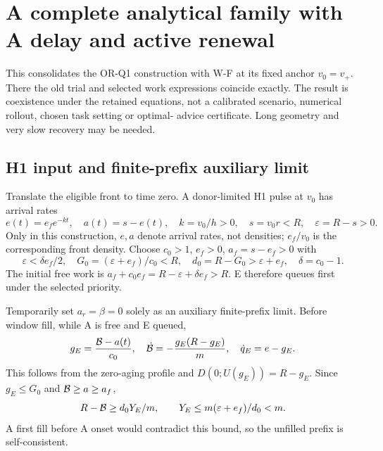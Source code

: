 \section{A complete analytical family with A delay and active renewal}
\label{sec:witness}
This consolidates the OR-Q1 construction with W-F at its fixed anchor
$v_0=v_+$. There the old trial and selected work expressions coincide
exactly. The result is coexistence under the retained equations, not a
calibrated scenario, numerical rollout, chosen task setting or optimal-
advice certificate. Long geometry and very slow recovery may be needed.

\subsection{H1 input and finite-prefix auxiliary limit}
Translate the eligible front to time zero. A donor-limited H1 pulse at
$v_0$ has arrival rates
\begin{equation}
 e(t)=e_f e^{-kt},\quad a(t)=s-e(t),\quad
 k=v_0/h>0,\quad s=v_0r<R,\quad\varepsilon=R-s>0.
 \label{eq:winput}
\end{equation}
Only in this construction, $e,a$ denote arrival rates, not densities;
$e_f/v_0$ is the corresponding front density. Choose $c_0>1$, $e_f>0$,
$a_f=s-e_f>0$ with
\begin{equation}
 \varepsilon<\delta e_f/2,\quad
 G_0=(\varepsilon+e_f)/c_0<R,\quad
 d_0=R-G_0>\varepsilon+e_f,\quad\delta=c_0-1.
 \label{eq:wconditions}
\end{equation}
The initial free work is $a_f+c_0e_f=R-\varepsilon+\delta e_f>R$.
E therefore queues first under the selected priority.

Temporarily set $a_r=\beta=0$ solely as an auxiliary finite-prefix limit.
Before window fill, while A is free and E queued,
\begin{equation}
 g_E=\frac{\mathcal B-a(t)}{c_0},\quad
 \dot{\mathcal B}=-\frac{g_E(R-g_E)}m,\quad
 \dot q_E=e-g_E. \label{eq:waux}
\end{equation}
This follows from the zero-aging profile and
$D(0;U(g_E))=R-g_E$. Since $g_E\leq G_0$ and
$\mathcal B\geq a\geq a_f$,
\begin{equation}
 R-\mathcal B\geq d_0Y_E/m,\qquad
 Y_E\leq m(\varepsilon+e_f)/d_0<m. \label{eq:wprefill}
\end{equation}
A first fill before A onset would contradict this bound, so the unfilled
prefix is self-consistent.

